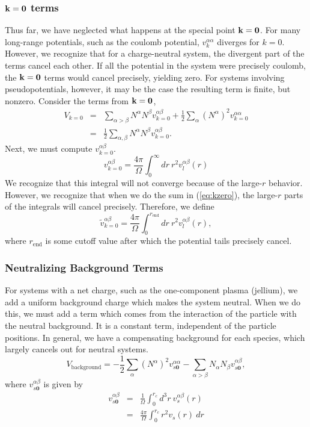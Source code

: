 \subsubsection{$\vk=\mathbf{0}$ terms}
Thus far, we have neglected what happens at the special point $\vk =
\mathbf{0}$.  For many long-range potentials, such as the coulomb
potential, $v_k^{\alpha \alpha}$ diverges for $k=0$.  However, we
recognize that for a charge-neutral system, the divergent part of the
terms cancel each other.  If all the potential in the system were
precisely coulomb, the $\vk=\mathbf{0}$ terms would cancel precisely,
yielding zero.  For systems involving pseudopotentials, however, it
may be the case the resulting term is finite, but nonzero.  Consider
the terms from $\vk=\mathbf{0}$,
\begin{eqnarray}
V_{k=0} & = & \sum_{\alpha>\beta} N^\alpha N^\beta v^{\alpha \beta}_{k=0}
+ \frac{1}{2} \sum_\alpha \left(N^{\alpha}\right)^2 v^{\alpha\alpha}_{k=0} \\
& = & \frac{1}{2} \sum_{\alpha,\beta} N^\alpha N^\beta v^{\alpha
  \beta}_{k=0}.
\label{eq:kzero}
\end{eqnarray}
Next, we must compute $v^{\alpha \beta}_{k=0}$.  
\begin{equation}
v^{\alpha \beta}_{k=0} = \frac{4 \pi}{\Omega} \int_0^\infty dr\ r^2
v_l^{\alpha \beta}(r)
\end{equation}
We recognize that this integral will not converge because of the
large-$r$ behavior.  However, we recognize that when we do the sum in
(\ref{eq:kzero}), the large-$r$ parts of the integrals will cancel
precisely.  Therefore, we define
\begin{equation}
\tilde{v}^{\alpha \beta}_{k=0} = \frac{4 \pi}{\Omega} 
\int_0^{r_\text{end}} dr\ r^2 v_l^{\alpha \beta}(r),
\end{equation}
where $r_{\text{end}}$ is some cutoff value after which the potential
tails precisely cancel.

\subsubsection{Neutralizing Background Terms}
For systems with a net charge, such as the one-component plasma
(jellium), we add a uniform background charge which makes the system
neutral.  When we do this, we must add a term which comes from the
interaction of the particle with the neutral background.  It is a
constant term, independent of the particle positions.  In general, we
have a compensating background for each species, which largely cancels
out for neutral systems.
\begin{equation}
V_\text{background} = -\frac{1}{2} \sum_\alpha \left(N^\alpha\right)^2 
v^{\alpha \alpha}_{s\mathbf{0}}
-\sum_{\alpha > \beta} N_\alpha N_\beta
v^{\alpha\beta}_{s\mathbf{0}},
\end{equation}
where $v^{\alpha \beta}_{s\mathbf{0}}$ is given by
\begin{eqnarray}
v^{\alpha \beta}_{s\mathbf{0}} & = & \frac{1}{\Omega} \int_0^{r_c} d^3 r\ 
v^{\alpha \beta}_s(r) \\
& = & \frac{4 \pi}{\Omega} \int_0^{r_c} r^2 v_s(r) \ dr \nonumber
\end{eqnarray}



